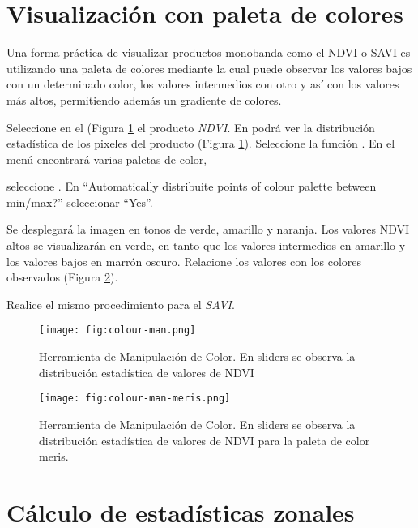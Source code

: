 \section{Visualización con paleta de colores}

Una forma práctica de visualizar productos monobanda como el NDVI o SAVI es utilizando una paleta de colores mediante la cual puede observar los valores bajos con un determinado color, los valores intermedios con otro y así con los valores más altos, permitiendo además un gradiente de colores. %

Seleccione en el  (Figura \ref{fig:color-man} el producto \emph{NDVI}. En  podrá ver la distribución estadística de los pixeles del producto (Figura \ref{fig:color-man}). Seleccione la función . En el menú encontrará varias paletas de color,

seleccione . En ``Automatically distribuite points of colour palette between min/max?'' seleccionar ``Yes''.

Se desplegará la imagen en tonos de verde, amarillo y naranja. Los valores NDVI altos se visualizarán en verde, en tanto que los valores intermedios en amarillo y los valores bajos en marrón oscuro. Relacione los valores con los colores observados (Figura \ref{fig:color-man-meris}).

Realice el mismo procedimiento para el \emph{SAVI}.

\begin{figure}[h!]
    \centering
    \texttt{[image: fig:colour-man.png]}
    \caption{Herramienta de Manipulación de Color. En sliders se observa la distribución estadística de valores de NDVI}
    \label{fig:color-man}
\end{figure}

\begin{figure}[h!]
    \centering
    \texttt{[image: fig:colour-man-meris.png]}
    \caption{Herramienta de Manipulación de Color. En sliders se observa la distribución estadística de valores de NDVI para la paleta de color meris.}
    \label{fig:color-man-meris}
\end{figure}

\section{Cálculo de estadísticas zonales}

